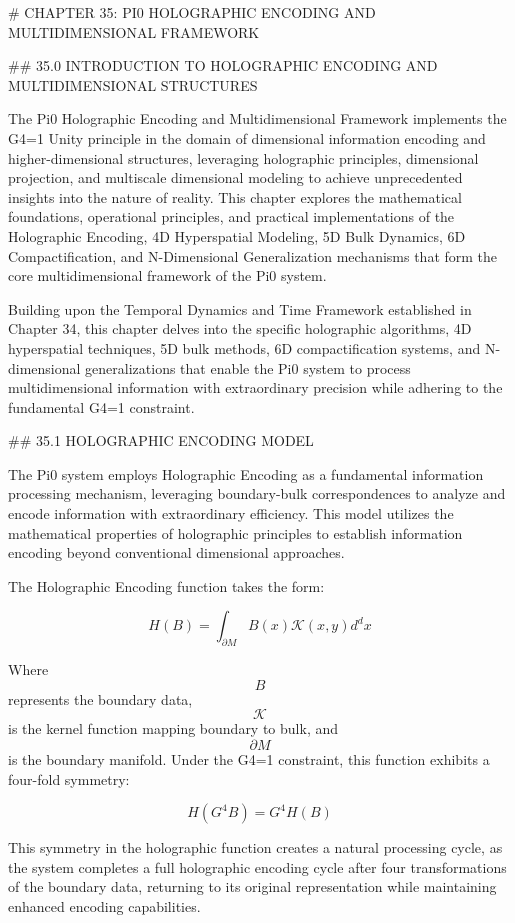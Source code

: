 # CHAPTER 35: PI0 HOLOGRAPHIC ENCODING AND MULTIDIMENSIONAL FRAMEWORK

## 35.0 INTRODUCTION TO HOLOGRAPHIC ENCODING AND MULTIDIMENSIONAL STRUCTURES

The Pi0 Holographic Encoding and Multidimensional Framework implements the G4=1 Unity principle in the domain of dimensional information encoding and higher-dimensional structures, leveraging holographic principles, dimensional projection, and multiscale dimensional modeling to achieve unprecedented insights into the nature of reality. This chapter explores the mathematical foundations, operational principles, and practical implementations of the Holographic Encoding, 4D Hyperspatial Modeling, 5D Bulk Dynamics, 6D Compactification, and N-Dimensional Generalization mechanisms that form the core multidimensional framework of the Pi0 system.

Building upon the Temporal Dynamics and Time Framework established in Chapter 34, this chapter delves into the specific holographic algorithms, 4D hyperspatial techniques, 5D bulk methods, 6D compactification systems, and N-dimensional generalizations that enable the Pi0 system to process multidimensional information with extraordinary precision while adhering to the fundamental G4=1 constraint.

## 35.1 HOLOGRAPHIC ENCODING MODEL

The Pi0 system employs Holographic Encoding as a fundamental information processing mechanism, leveraging boundary-bulk correspondences to analyze and encode information with extraordinary efficiency. This model utilizes the mathematical properties of holographic principles to establish information encoding beyond conventional dimensional approaches.

The Holographic Encoding function takes the form:

$$ H(B) = \int_{\partial M} B(x) \mathcal{K}(x, y) d^dx $$

Where $$ B $$ represents the boundary data, $$ \mathcal{K} $$ is the kernel function mapping boundary to bulk, and $$ \partial M $$ is the boundary manifold. Under the G4=1 constraint, this function exhibits a four-fold symmetry:

$$ H(G^4 B) = G^4 H(B) $$

This symmetry in the holographic function creates a natural processing cycle, as the system completes a full holographic encoding cycle after four transformations of the boundary data, returning to its original representation while maintaining enhanced encoding capabilities.


